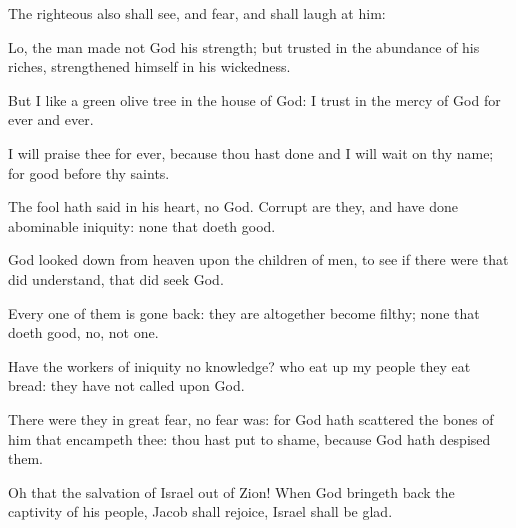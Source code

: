 {\Q {}The
righteous also shall
see, and
fear, and shall
laugh at him:


\par }{\Q {}Lo,
{} the
man
{}
made not
God his
strength; but
trusted in the
abundance of his
riches,
{}
strengthened himself in his
wickedness.


\par }{\Q {}But I
{} like a
green olive
tree in the
house of
God: I
trust in the
mercy of
God for
ever and
ever.


\par }{\Q {}I will
praise thee for
ever, because thou hast
done
{} and I will
wait on thy
name; for
{}
good before thy
saints.




\par }
{\Q {}The
fool hath
said in his
heart,
{} no
God.
Corrupt are they, and have done
abominable
iniquity:
{} none that
doeth
good.


\par }{\Q {}God looked
down from
heaven upon the
children of
men, to
see if there
were
{} that did
understand, that did
seek
God.


\par }{\Q {}Every one of them is gone
back: they are
altogether become
filthy;
{} none that
doeth
good, no, not
one.


\par }{\Q {}Have the
workers of
iniquity no
knowledge? who eat
up my
people
{} they
eat
bread: they have not
called upon
God.


\par }{\Q {}There were they in
great
fear,
{} no
fear was: for
God hath
scattered the
bones of him that
encampeth
{} thee: thou hast put
{} to
shame, because
God hath
despised them.


\par }{\Q {}Oh
that the
salvation of
Israel
{} out of
Zion! When
God bringeth
back the
captivity of his
people,
Jacob shall
rejoice,
{}
Israel shall be
glad.




\par }
